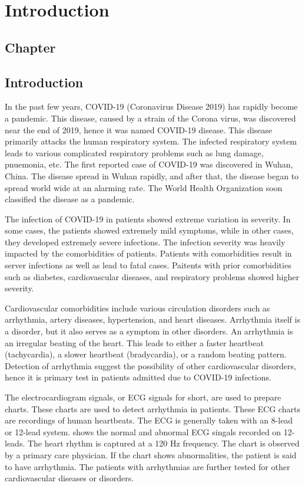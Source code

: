 \thispagestyle{fancy}
\chapter{Introduction} \label{ch:introduction}
\section*{\centering Chapter \thechapter}
\section*{\centering Introduction}

In the past few years, COVID-19 (Coronavirus Disease 2019) has rapidly become a pandemic. This disease, caused by a strain of the Corona virus, was discovered near the end of 2019, hence it was named COVID-19 disease. This disease primarily attacks the human respiratory system. The infected respiratory system leads to various complicated respiratory problems such as lung damage, pnuemonia, etc. The first reported case of COVID-19 was discovered in Wuhan, China. The disease spread in Wuhan rapidly, and after that, the disease began to spread world wide at an alarming rate. The World Health Organization soon classified the disease as a pandemic.

The infection of COVID-19 in patients showed extreme variation in severity. In some cases, the patients showed extremely mild symptoms, while in other cases, they developed extremely severe infections. The infection severity was heavily impacted by the comorbidities of patients. Patients with comorbidities result in server infections as well as lead to fatal cases. Paitents with prior comorbidities such as diabetes, cardiovascular diseases, and respiratory problems showed higher severity.

Cardiovascular comorbidities include various circulation disorders such as arrhythmia, artery diseases, hypertension, and heart diseases. Arrhythmia itself is a disorder, but it also serves as a symptom in other disorders. An arrhythmia is an irregular beating of the heart. This leads to either a faster heartbeat (tachycardia), a slower heartbeat (bradycardia), or a random beating pattern. Detection of arrhythmia suggest the possibility of other cardiovascular disorders, hence it is primary test in patients admitted due to COVID-19 infections.

The electrocardiogram signals, or ECG signals for short, are used to prepare charts. These charts are used to detect arrhythmia in patients. These ECG charts are recordings of human heartbeats. The ECG is generally taken with an 8-lead or 12-lead system.  shows the normal and abnormal ECG singals recorded on 12-leads. The heart rhythm is captured at a 120 Hz frequency. The chart is observed by a primary care physician. If the chart shows abnormalities, the patient is said to have arrhythmia. The patients with arrhythmias are further tested for other cardiovascular diseases or disorders.

